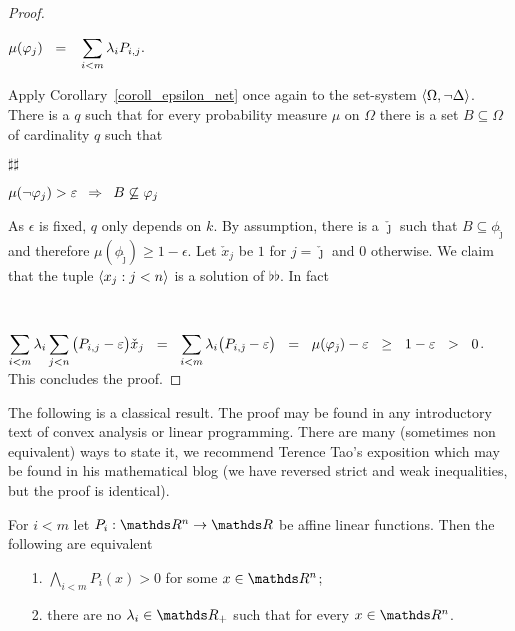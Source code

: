 \documentclass[creche.tex]{subfiles}
\begin{document}
\begin{proof}
\parbox{10ex}{~}
$\displaystyle\mu(\phi_j)\medrel{=}\sum_{i<m}\lambda_i P_{i,j}.$

Apply Corollary~\ref{coroll_epsilon_net} once again to the set-system $\langle\Omega,\neg\Delta\rangle$. There is a $q$ such that for every probability measure $\mu$ on $\Omega$ there is a set $B\subseteq\Omega$ of cardinality $q$ such that

\parbox{10ex}{$\sharp\sharp$}
$\displaystyle\mu(\neg\phi_j)>\epsilon\medrel{\IMP}B\not\subseteq\phi_j$

As $\epsilon$ is fixed, $q$ only depends on $k$. By assumption, there is a $\check\jmath$ such that $B\subseteq\phi_{\check\jmath}$ and therefore $\mu(\phi_{\check\jmath})\ge1-\epsilon$. Let $\check x_j$ be $1$ for $j=\check\jmath$ and $0$ otherwise. We claim that the tuple $\langle x_j:j<n\rangle$ is a solution of $\flat\flat$. In fact

\parbox{10ex}{~}
$\displaystyle\sum_{i<m}\lambda_i\sum_{j<n}\big(P_{i,j}-\epsilon\big)\check x_j\medrel{=}{\sum_{i<m}\lambda_i\big(P_{i,\check\jmath}-\epsilon\big)}\medrel{=}\mu(\phi_{\check\jmath})-\epsilon\medrel{\ge}1-\epsilon\medrel{>}0$.
This concludes the proof.
\end{proof}

The following is a classical result. The proof may be found in any introductory text of convex analysis or linear programming. There are many (sometimes non equivalent) ways to state it, we recommend  Terence Tao's exposition which may be found in his mathematical blog (we have reversed strict and weak inequalities, but the proof is identical).

\begin{proposition}
For $i<m$ let $P_i:\RR^n\to\RR$ be affine linear functions. Then the following are equivalent\nobreak  
\begin{itemize}
\item[1.] $\displaystyle\bigwedge_{i<m}P_i(x)> 0$ for some $x\in\RR^n$;
\item[2.] there are no $\lambda_i\in\RR_+$ such that  for every $x\in\RR^n$.\QED
\end{itemize}
\end{proposition}
\end{document}
